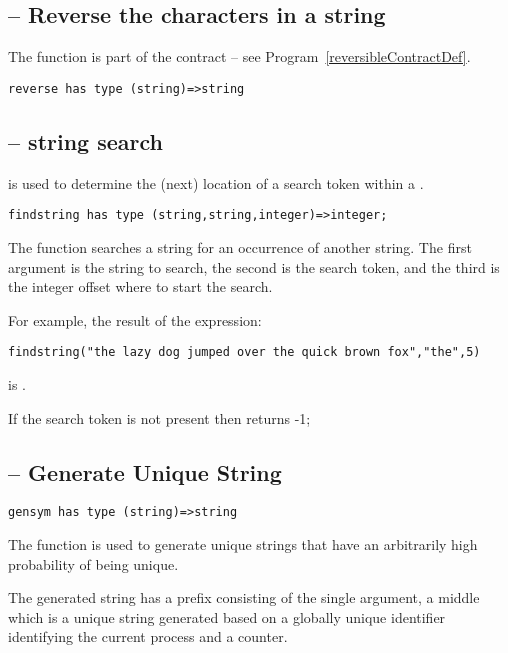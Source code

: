 \subsection{ -- Reverse the characters in a string}
\label{stringReverseFunction}
The  function is part of the  contract -- see Program~\vref{reversibleContractDef}.
\begin{lstlisting}
reverse has type (string)=>string
\end{lstlisting}

\subsection{ -- string search}
\label{findStringFunction}
 is used to determine the (next) location of a search token within a .
\begin{lstlisting}
findstring has type (string,string,integer)=>integer;
\end{lstlisting}

The  function searches a string for an occurrence of another string. The first argument is the string to search, the second is the search token, and the third is the integer offset where to start the search.

For example, the result of the expression:
\begin{lstlisting}
findstring("the lazy dog jumped over the quick brown fox","the",5)
\end{lstlisting}
is .

If the search token is not present then  returns -1;

\subsection{ -- Generate Unique String}
\label{gensym}
\begin{lstlisting}
gensym has type (string)=>string
\end{lstlisting}
The  function is used to generate unique strings that have an arbitrarily high probability of being unique.

The generated string has a prefix consisting of the single argument, a middle which is a unique string generated based on a globally unique identifier identifying the current process and a counter.


